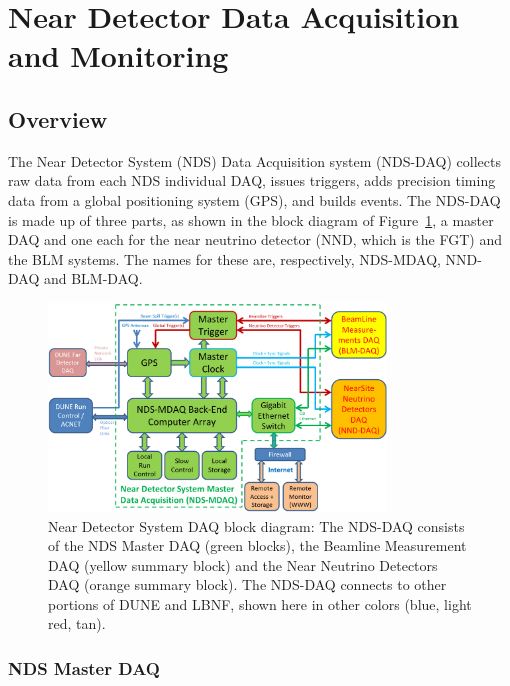 \section{Near Detector Data Acquisition and Monitoring}
\label{sec:daq-nd}

\subsection{Overview}
The Near Detector System (NDS) Data Acquisition system (NDS-DAQ)
collects raw data from each NDS individual DAQ, issues
triggers, adds precision timing data from a global positioning system
(GPS), and builds events.  The NDS-DAQ is made up of three parts, as
shown in the block diagram of Figure~\ref{fig:nds-daq-block}, a master DAQ
and one each for the near neutrino detector (NND, which is the FGT)
and the BLM systems. The names for these are, respectively, NDS-MDAQ,
NND-DAQ and BLM-DAQ.

\begin{figure}[h!]
\centering
\includegraphics[width=0.8\textwidth]{daq-nd-block-diagram.png}
\caption{Near Detector System DAQ block diagram: The NDS-DAQ consists of the NDS Master
DAQ (green blocks), the Beamline Measurement DAQ (yellow summary block) and the Near Neutrino
Detectors DAQ (orange summary block). The NDS-DAQ connects to other portions of DUNE and
LBNF, shown here in other colors (blue, light red, tan).}
\label{fig:nds-daq-block}
\end{figure}

\subsubsection{NDS Master DAQ} 
\label{cdrsec:nd-master-daq}

